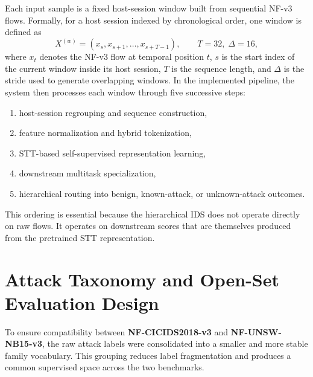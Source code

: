 \documentclass[12pt, a4paper]{report}
\begin{document}
Each input sample is a fixed host-session window built from sequential NF-v3 flows. Formally, for a host session indexed by chronological order, one window is defined as
\begin{equation}
X^{(w)} = (x_s, x_{s+1}, \dots, x_{s+T-1}), \qquad T=32,\; \Delta=16,
\end{equation}
where $x_t$ denotes the NF-v3 flow at temporal position $t$, $s$ is the start index of the current window inside its host session, $T$ is the sequence length, and $\Delta$ is the stride used to generate overlapping windows. In the implemented pipeline, the system then processes each window through five successive steps:
\begin{enumerate}
    \item host-session regrouping and sequence construction,
    \item feature normalization and hybrid tokenization,
    \item STT-based self-supervised representation learning,
    \item downstream multitask specialization,
    \item hierarchical routing into benign, known-attack, or unknown-attack outcomes.
\end{enumerate}
This ordering is essential because the hierarchical IDS does not operate directly on raw flows. It operates on downstream scores that are themselves produced from the pretrained STT representation.

\section{Attack Taxonomy and Open-Set Evaluation Design}

To ensure compatibility between \textbf{NF-CICIDS2018-v3}\cite{NF3_IDS2018} and \textbf{NF-UNSW-NB15-v3}\cite{NF_UNSW_NB15_v3}, the raw attack labels were consolidated into a smaller and more stable family vocabulary. This grouping reduces label fragmentation and produces a common supervised space across the two benchmarks.
\end{document}
